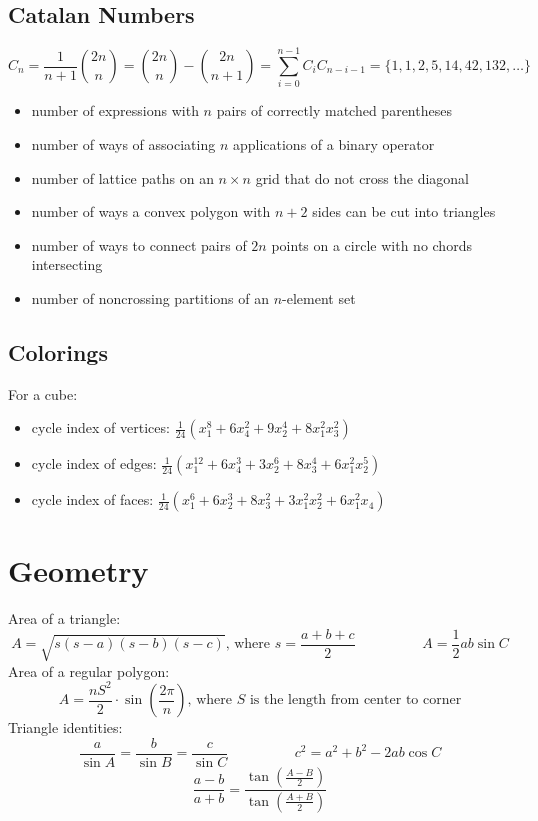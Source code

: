 \documentclass{article}
\begin{document}
\subsection{Catalan Numbers}
\[ C_n = \frac{1}{n + 1} \binom{2n}{n} = \binom{2n}{n} - \binom{2n}{n + 1} = \sum_{i = 0}^{n - 1} C_iC_{n - i - 1} = \{ 1, 1, 2, 5, 14, 42, 132, \dots \} \]
\begin{itemize}
\item number of expressions with $n$ pairs of correctly matched parentheses
\item number of ways of associating $n$ applications of a binary operator
\item number of lattice paths on an $n \times n$ grid that do not cross the diagonal
\item number of ways a convex polygon with $n + 2$ sides can be cut into triangles
\item number of ways to connect pairs of $2n$ points on a circle with no chords intersecting
\item number of noncrossing partitions of an $n$-element set
\end{itemize}

\subsection{Colorings}
For a cube:
\begin{itemize}
	\item cycle index of vertices: $\frac{1}{24} \left( x_1^8 + 6x_4^2 + 9x_2^4 + 8x_1^2x_3^2 \right)$
	\item cycle index of edges: $\frac{1}{24} \left( x_1^{12} + 6x_4^3 + 3x_2^6 + 8x_3^4 + 6x_1^2x_2^5 \right)$
	\item cycle index of faces: $\frac{1}{24} \left( x_1^6 + 6x_2^3 + 8x_3^2 + 3x_1^2x_2^2 + 6x_1^2x_4 \right)$
\end{itemize}

\section{Geometry}


\newpage

Area of a triangle:
\[ A = \sqrt{s (s - a)(s - b)(s - c)} \text{, where } s = \frac{a + b + c}{2} \hspace{2cm} A = \frac{1}{2} ab \sin C \]
Area of a regular polygon:
\[ A = \frac{nS^2}{2} \cdot \sin \left( \frac{2\pi}{n} \right) \text{, where $S$ is the length from center to corner} \]
Triangle identities:
\[ \frac{a}{\sin A} = \frac{b}{\sin B} = \frac{c}{\sin C} \hspace{2cm} c^2 = a^2 + b^2 - 2ab \cos C \]
\[ \frac{a- b}{a + b} = \frac{\tan \left( \frac{A - B}{2} \right)}{\tan \left(\frac{A + B}{2} \right) } \]
\end{document}
